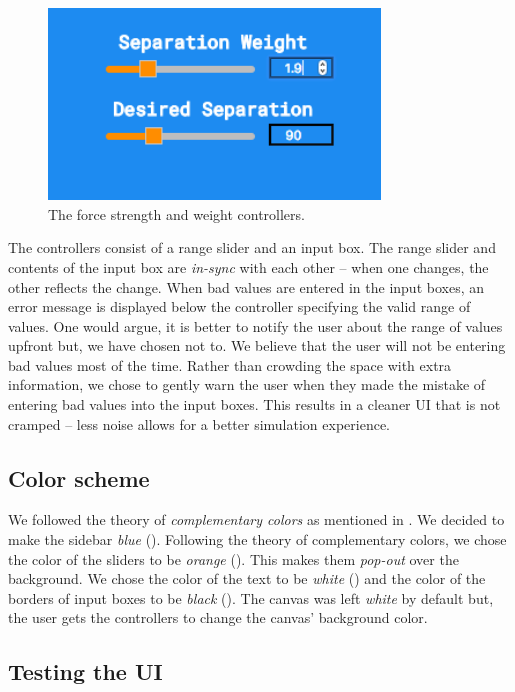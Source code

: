 \documentclass[../main]{subfiles}
\begin{document}
\begin{figure}
	\centering
	\includegraphics[scale=0.35, width=250pt, frame]{resources/force_sliders.png}
	\caption{The force strength and weight controllers.}
	\label{forceSliders}
\end{figure}

The controllers consist of a range slider and an input box. The range slider and contents of the input box are {\em in-sync} with each other -- when one changes, the other reflects the change. When bad values are entered in the input boxes, an error message is displayed below the controller specifying the valid range of values. One would argue, it is better to notify the user about the range of values upfront but, we have chosen not to. We believe that the user will not be entering bad values most of the time. Rather than crowding the space with extra information, we chose to gently warn the user when they made the mistake of entering bad values into the input boxes. This results in a cleaner UI that is not cramped -- less noise allows for a better simulation experience.

\subsection{Color scheme}
\label{colorScheme}

We followed the theory of {\em complementary colors} as mentioned in \cite{colorTheory}. We decided to make the sidebar {\em blue} (). Following the theory of complementary colors, we chose the color of the sliders to be {\em orange} (). This makes them {\em pop-out} over the background. We chose the color of the text to be {\em white} () and the color of the borders of input boxes to be {\em black} (). The canvas was left {\em white} by default but, the user gets the controllers to change the canvas' background color.

\subsection{Testing the UI}
\label{uiTesting}
\end{document}
